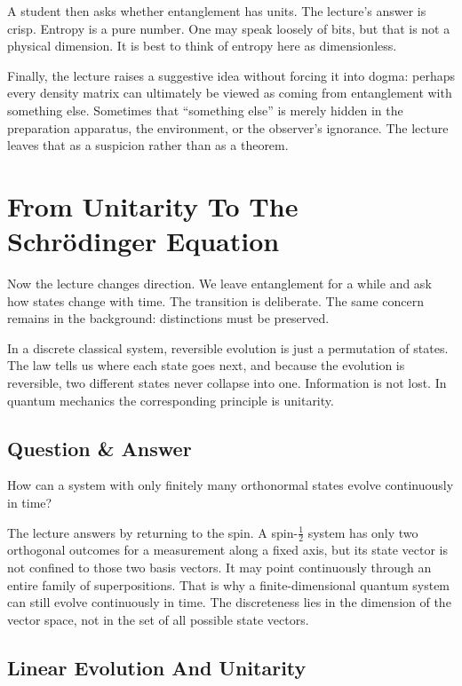 A student then asks whether entanglement has units. The lecture's answer is crisp. Entropy is a pure number. One may speak loosely of bits, but that is not a physical dimension. It is best to think of entropy here as dimensionless.

Finally, the lecture raises a suggestive idea without forcing it into dogma: perhaps every density matrix can ultimately be viewed as coming from entanglement with something else. Sometimes that ``something else'' is merely hidden in the preparation apparatus, the environment, or the observer's ignorance. The lecture leaves that as a suspicion rather than as a theorem.

\section{From Unitarity To The Schr\"odinger Equation}

Now the lecture changes direction. We leave entanglement for a while and ask how states change with time. The transition is deliberate. The same concern remains in the background: distinctions must be preserved.

In a discrete classical system, reversible evolution is just a permutation of states. The law tells us where each state goes next, and because the evolution is reversible, two different states never collapse into one. Information is not lost. In quantum mechanics the corresponding principle is unitarity.

\subsection{Question \& Answer}

How can a system with only finitely many orthonormal states evolve continuously in time?

The lecture answers by returning to the spin. A spin-\(\tfrac12\) system has only two orthogonal outcomes for a measurement along a fixed axis, but its state vector is not confined to those two basis vectors. It may point continuously through an entire family of superpositions. That is why a finite-dimensional quantum system can still evolve continuously in time. The discreteness lies in the dimension of the vector space, not in the set of all possible state vectors.

\subsection{Linear Evolution And Unitarity}


